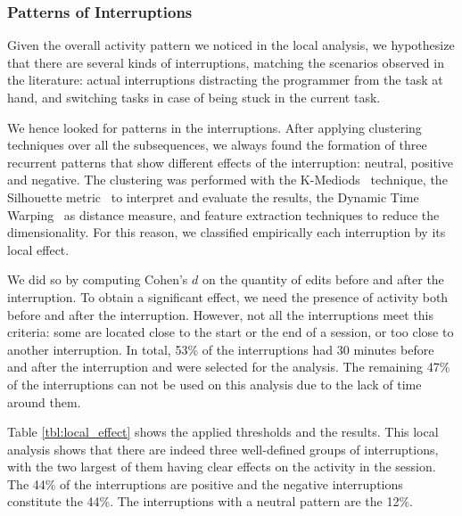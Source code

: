 \subsubsection{Patterns of Interruptions}
Given the overall activity pattern we noticed in the local analysis, we hypothesize that there are several kinds of interruptions, matching the scenarios observed in the literature: actual interruptions distracting the programmer from the task at hand, and switching tasks in case of being stuck in the current task.

We hence looked for patterns in the interruptions. After applying clustering techniques over all the subsequences, we always found the formation of three recurrent patterns that show different effects of the interruption: neutral, positive and negative. The clustering was performed with the  K-Mediods~\cite{AMP97} technique, the Silhouette metric~\cite{RP87} to interpret and evaluate the results, the Dynamic Time Warping~\cite{KE05} as distance measure, and feature extraction techniques to reduce the dimensionality.  For this reason, we classified empirically each interruption by its local effect. 

We did so by computing Cohen's $d$ on the quantity of edits before and after the interruption. To obtain a significant effect, we need the presence of activity both before and after the interruption. However, not all the interruptions meet this criteria: some are located close to the start or the end of a session, or too close to another interruption.  In total, 53\% of the interruptions had 30 minutes before and after the interruption and were selected for the analysis.  The remaining 47\% of the interruptions can not be used on this analysis due to the lack of time around them.


Table \ref{tbl:local_effect} shows the applied thresholds and the results. This local analysis shows that there are indeed three well-defined groups of interruptions, with the two largest of them having clear effects on the activity in the session. The 44\% of the interruptions are positive and the negative interruptions constitute the 44\%. The interruptions with a neutral pattern are the 12\%.


